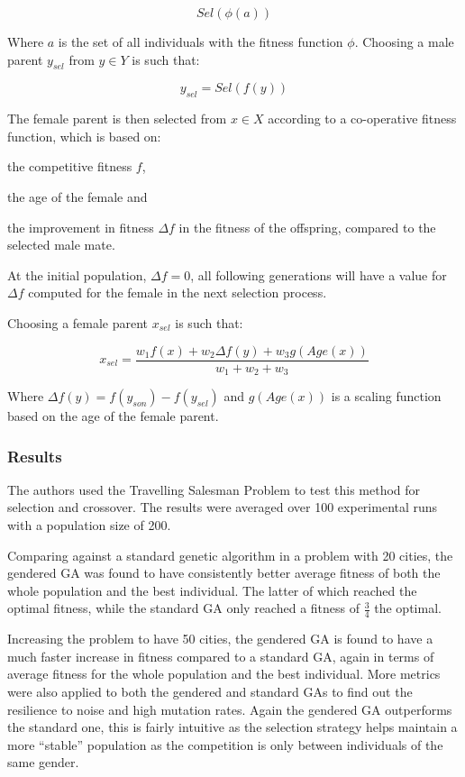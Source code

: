 \documentclass[10pt, a4paper]{article}
\begin{document}
\begin{equation}
Sel(\phi(a))
\end{equation}

Where $a$ is the set of all individuals with the fitness function $\phi$.
Choosing a male parent $y_{sel}$ from $y \in Y$ is such that:

\begin{equation}
y_{sel} = Sel(f(y))
\end{equation}

The female parent is then selected from $x \in X$ according to a co-operative
fitness function, which is based on:
\begin{inparaenum}[a\upshape)]
\item the competitive fitness $f$,
\item the age of the female and
\item the improvement in fitness $\Delta f$ in the fitness of the offspring,
      compared to the selected male mate.
\end{inparaenum}

At the initial population, $\Delta f = 0$, all following generations will have a
value for $\Delta f$ computed for the female in the next selection process.

Choosing a female parent $x_{sel}$ is such that:

\begin{equation}
x_{sel} = \frac{w_1 f(x) + w_2 \Delta f(y) + w_3 g(Age(x))}{w_1 + w_2 + w_3}
\end{equation}

Where $\Delta f(y) = f(y_{son}) - f(y_{sel})$ and $g(Age(x))$ is a scaling
function based on the age of the female parent.


\subsubsection{Results}
The authors used the Travelling Salesman Problem to test this method for
selection and crossover. The results were averaged over 100 experimental runs
with a population size of 200.

Comparing against a standard genetic algorithm in a problem with 20 cities, the
gendered GA was found to have consistently better average fitness of both the
whole population and the best individual. The latter of which reached the
optimal fitness, while the standard GA only reached a fitness of $\frac{3}{4}$
the optimal.

Increasing the problem to have 50 cities, the gendered GA is found to have a
much faster increase in fitness compared to a standard GA, again in terms of
average fitness for the whole population and the best individual. More metrics
were also applied to both the gendered and standard GAs to find out the
resilience to noise and high mutation rates. Again the gendered GA outperforms
the standard one, this is fairly intuitive as the selection strategy helps
maintain a more ``stable'' population as the competition is only between
individuals of the same gender.
\end{document}
